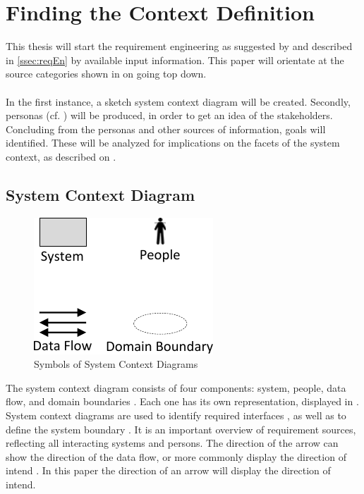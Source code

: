 \section{Finding the Context Definition}
This thesis will start the requirement engineering as suggested by \textcite[55]{Pohl.2007} and described in \cref{ssec:reqEn} by available input information. This paper will orientate at the source categories shown in  on  going top down. 

\paragraph{} In the first instance, a sketch system context diagram will be created. Secondly, personas (cf. ) will be produced, in order to get an idea of the stakeholders. Concluding from the personas and other sources of information, goals will identified. These will be analyzed for implications on the facets of the system context, as described on .


\subsection{System Context Diagram}
\begin{figure}[H]
    \centering
    \includegraphics[scale=1]{img/SCDSymbols.pdf}
    \caption[Symbols of System Context Diagrams]{Symbols of System Context Diagrams \parencites[77]{Lauesen.2008}}
    \label{fig:scdSym}
\end{figure}
The system context diagram consists of four components: system, people, data flow, and domain boundaries \parencites[cf.][76-77]{Lauesen.2008}. Each one has its own representation, displayed in . System context diagrams are used to identify required interfaces \parencites[cf.][75]{Lauesen.2008}, as well as to define the system boundary \parencites[cf.][75]{Ebert.2014}. It is an important overview of requirement sources, reflecting all interacting systems and persons. The direction of the arrow can show the direction of the data flow, or more commonly display the direction of intend \parencite[cf.][77]{Lauesen.2008}. In this paper the direction of an arrow will display the direction of intend.

